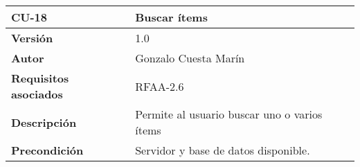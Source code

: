 \begin{longtable}[]{@{}ll@{}}
\toprule
\begin{minipage}[b]{0.25\columnwidth}\raggedright
\textbf{CU-18}\strut
\end{minipage} & \begin{minipage}[b]{0.69\columnwidth}\raggedright
\textbf{Buscar ítems}\strut
\end{minipage}\tabularnewline
\midrule
\endhead
\begin{minipage}[t]{0.25\columnwidth}\raggedright
\textbf{Versión}\strut
\end{minipage} & \begin{minipage}[t]{0.69\columnwidth}\raggedright
1.0\strut
\end{minipage}\tabularnewline
\begin{minipage}[t]{0.25\columnwidth}\raggedright
\textbf{Autor}\strut
\end{minipage} & \begin{minipage}[t]{0.69\columnwidth}\raggedright
Gonzalo Cuesta Marín\strut
\end{minipage}\tabularnewline
\begin{minipage}[t]{0.25\columnwidth}\raggedright
\textbf{Requisitos asociados}\strut
\end{minipage} & \begin{minipage}[t]{0.69\columnwidth}\raggedright
RFAA-2.6\strut
\end{minipage}\tabularnewline
\begin{minipage}[t]{0.25\columnwidth}\raggedright
\textbf{Descripción}\strut
\end{minipage} & \begin{minipage}[t]{0.69\columnwidth}\raggedright
Permite al usuario buscar uno o varios ítems\strut
\end{minipage}\tabularnewline
\begin{minipage}[t]{0.25\columnwidth}\raggedright
\textbf{Precondición}\strut
\end{minipage} & \begin{minipage}[t]{0.69\columnwidth}\raggedright
Servidor y base de datos disponible.


\end{minipage}
\end{longtable}
